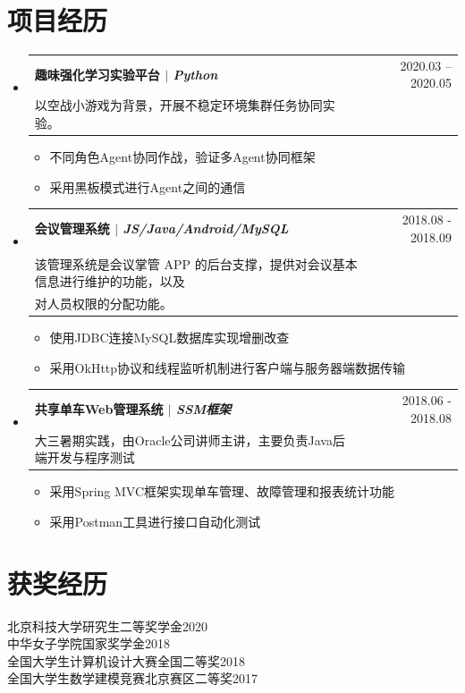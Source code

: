 \documentclass[a4paper,11pt]{ctexart}
\makeatletter
\newcommand{\CVItem}[1]{
	\item\small{
		{#1 \vspace{-2pt}}
	}
}
\newcommand{\CVSubheading}[4]{
	\vspace{-2pt}\item
	\begin{tabular*}{0.97\textwidth}[t]{l@{\extracolsep{\fill}}r}
		\textbf{#1} & #2 \\
		\small#3 & \small #4 \\
	\end{tabular*}\vspace{-7pt}
}
\newcommand{\CVSubHeadingListStart}{\begin{itemize}[leftmargin=0.5cm, label={}]}
\newcommand{\CVSubHeadingListEnd}{\end{itemize}}
\newcommand{\CVItemListStart}{\vspace{-4pt}\begin{itemize}}
\newcommand{\CVItemListEnd}{\end{itemize}\vspace{-5pt}}
\makeatother
\begin{document}
	\section{项目经历}
	\CVSubHeadingListStart
	\CVSubheading
	{{趣味强化学习实验平台}  $|$ \emph{\small{Python}}}{2020.03 -- 2020.05}
	{以空战小游戏为背景，开展不稳定环境集群任务协同实验。}{}
	\CVItemListStart
	\CVItem{不同角色Agent协同作战，验证多Agent协同框架}
	\CVItem{采用黑板模式进行Agent之间的通信}
	\CVItemListEnd
	\CVSubheading
	{{会议管理系统}  $|$ \emph{\small{JS/Java/Android/MySQL}}}{2018.08 - 2018.09}
	{\makecell[l]{2018年(第6届)中国大学生计算机设计大赛软件服务外包竞赛（移动终端应用）。\\
			该管理系统是会议掌管 APP 的后台支撑，提供对会议基本信息进行维护的功能，以及\\
			对人员权限的分配功能。
	}}{}
	\CVItemListStart
	\CVItem{使用JDBC连接MySQL数据库实现增删改查}
	\CVItem{采用OkHttp协议和线程监听机制进行客户端与服务器端数据传输}
	\CVItemListEnd
	\CVSubheading
	{{共享单车Web管理系统}  $|$ \emph{\small{SSM框架}}}{2018.06 - 2018.08}
	{大三暑期实践，由Oracle公司讲师主讲，主要负责Java后端开发与程序测试}{}
	\CVItemListStart
	\CVItem{采用Spring MVC框架实现单车管理、故障管理和报表统计功能}
	\CVItem{采用Postman工具进行接口自动化测试}
	\CVItemListEnd
	
	\CVSubHeadingListEnd
	

	
	
	

	
	\section{获奖经历}
	{北京科技大学研究生二等奖学金}\hfill{2020}\\
	{中华女子学院国家奖学金}\hfill{2018} \\
	{全国大学生计算机设计大赛全国二等奖}\hfill{2018} \\
	{全国大学生数学建模竞赛北京赛区二等奖}\hfill{2017}\\

	
\end{document}
